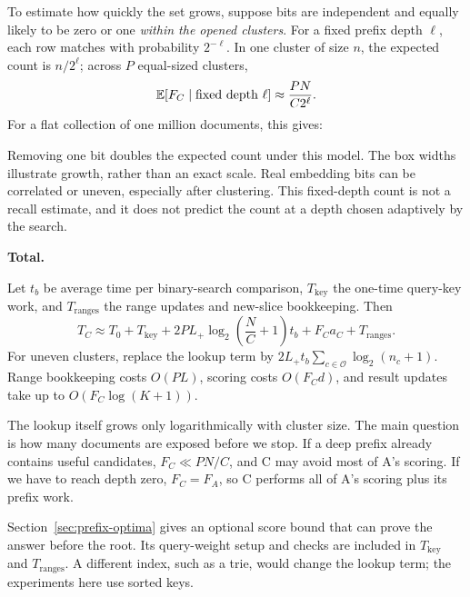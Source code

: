 To estimate how quickly the set grows, suppose bits are independent and equally likely to be zero or one \emph{within the opened clusters}. For a fixed prefix depth $\ell$, each row matches with probability $2^{-\ell}$. In one cluster of size $n$, the expected count is $n/2^\ell$; across $P$ equal-sized clusters,
\[
 \mathbb E[F_C\mid\text{fixed depth }\ell]\approx\frac{PN}{C2^\ell}.
\]
For a flat collection of one million documents, this gives:
\begin{center}
\end{center}
Removing one bit doubles the expected count under this model. The box widths illustrate growth, rather than an exact scale. Real embedding bits can be correlated or uneven, especially after clustering. This fixed-depth count is not a recall estimate, and it does not predict the count at a depth chosen adaptively by the search.

\textbf{Total.}\par
Let $t_b$ be average time per binary-search comparison, $T_{\mathrm{key}}$ the one-time query-key work, and $T_{\mathrm{ranges}}$ the range updates and new-slice bookkeeping. Then
\[
 \boxed{T_C\approx T_0+T_{\mathrm{key}}
       +2PL_+\log_2\!\left(\frac NC+1\right)t_b
       +F_Ca_C+T_{\mathrm{ranges}}.}
\]
For uneven clusters, replace the lookup term by $2L_+t_b\sum_{c\in\mathcal O}\log_2(n_c+1)$. Range bookkeeping costs $O(PL)$, scoring costs $O(F_Cd)$, and result updates take up to $O(F_C\log(K+1))$.

The lookup itself grows only logarithmically with cluster size. The main question is how many documents are exposed before we stop. If a deep prefix already contains useful candidates, $F_C\ll PN/C$, and C may avoid most of A's scoring. If we have to reach depth zero, $F_C=F_A$, so C performs all of A's scoring plus its prefix work.

Section~\ref{sec:prefix-optima} gives an optional score bound that can prove the answer before the root. Its query-weight setup and checks are included in $T_{\mathrm{key}}$ and $T_{\mathrm{ranges}}$. A different index, such as a trie, would change the lookup term; the experiments here use sorted keys.

